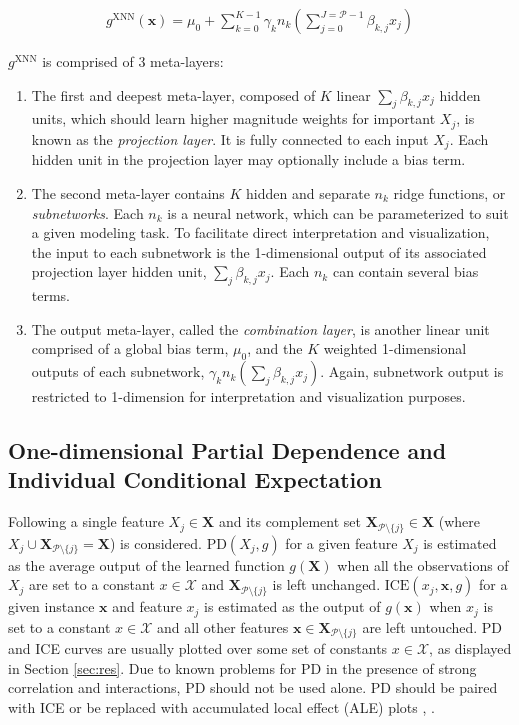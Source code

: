 \documentclass[information,article,submit,moreauthors,pdftex]{definitions/mdpi}
\begin{document}
\begin{equation}
\begin{aligned}
\label{eq:xnn}
g^{\text{XNN}}(\mathbf{x}) = \mu_0 + \sum_{k=0}^{K-1}\gamma_k n_k(\sum^{J=\mathcal{P}-1}_{j=0}\beta_{k, j}x_j)
\end{aligned}
\end{equation}

\noindent $g^{\text{XNN}}$ is comprised of 3 meta-layers:

\begin{enumerate}[leftmargin=*,labelsep=4.9mm]
	\item The first and deepest meta-layer, composed of $K$ linear $\sum_j\beta_{k,j}x_j$ hidden units, which should learn higher magnitude weights for important $X_j$, is known as the \textit{projection layer}. It is fully connected to each input $X_j$. Each hidden unit in the projection layer may optionally include a bias term.
	\item The second meta-layer contains $K$ hidden and separate $n_k$ ridge functions, or \textit{subnetworks}. Each $n_k$ is a neural network, which can be parameterized to suit a given modeling task. To facilitate direct interpretation and visualization, the input to each subnetwork is the 1-dimensional output of its associated projection layer hidden unit, $\sum_j\beta_{k,j}x_j$. Each $n_k$ can contain several bias terms.
	\item The output meta-layer, called the \textit{combination layer}, is another linear unit comprised of a global bias term, $\mu_0$, and the $K$ weighted 1-dimensional outputs of each subnetwork, $\gamma_kn_k(\sum_j\beta_{k,j}x_j)$. Again, subnetwork output is restricted to 1-dimension for interpretation and visualization purposes.
\end{enumerate}

\subsection{One-dimensional Partial Dependence and Individual Conditional Expectation}\label{a_ssec:pd_ice}

Following \citet{esl} a single feature $X_j \in \mathbf{X}$ and its complement set $\mathbf{X}_{\mathcal{P} \setminus \{j\}} \in \mathbf{X}$ (where $X_j \cup \mathbf{X}_{\mathcal{P} \setminus \{j\}} = \mathbf{X}$) is considered. $\text{PD}(X_j, g)$ for a given feature $X_j$ is estimated as the average output of the learned function $g(\mathbf{X})$ when all the observations of $X_j$ are set to a constant $x \in \mathcal{X}$ and $\mathbf{X}_{\mathcal{P} \setminus \{j\}}$ is left unchanged. $\text{ICE}(x_j, \mathbf{x}, g)$ for a given instance $\mathbf{x}$ and feature $x_j$ is estimated as the output of $g(\mathbf{x})$ when $x_j$ is set to a constant $x \in \mathcal{X}$ and all other features $\mathbf{x} \in \mathbf{X}_{\mathcal{P} \setminus \{j\}}$ are left untouched. PD and ICE curves are usually plotted over some set of constants $x \in \mathcal{X}$, as displayed in Section \ref{sec:res}. Due to known problems for PD in the presence of strong correlation and interactions, PD should not be used alone. PD should be paired with ICE or be replaced with accumulated local effect (ALE) plots \cite{ice_plots}, \cite{ale_plot}.
\end{document}
